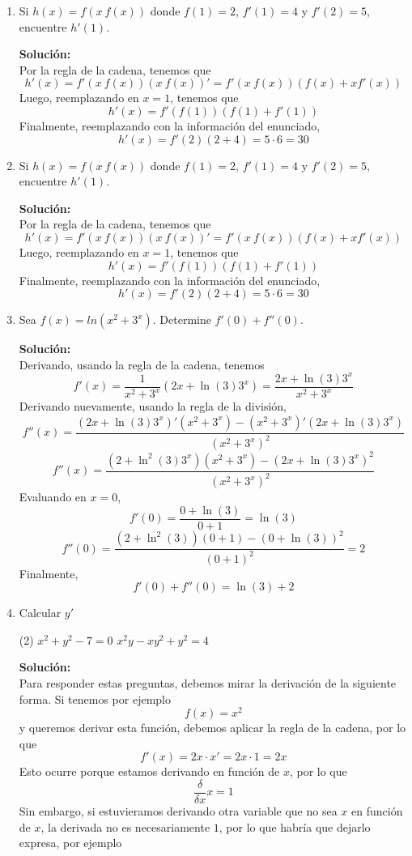 \documentclass[12pt]{article}
\newenvironment{solucion}
{\begin{mdframed}[backgroundcolor=black!10]
		{\bf Solución:}\\
	}
	{
	\end{mdframed}
}
\newenvironment{preguntas}
{\begin{enumerate}\itemsep12pt
	}
	{
	\end{enumerate}
}
\begin{document}
\begin{preguntas}
\begin{solucion}
$$g'(1) =\dfrac{-2(f(1))^5 - 5(f(1))^4f'(1)}{(f(1))^{10}} = -2-5\cdot (-2) = 8$$
\end{solucion}
\item Si $h(x) = f(x\ f(x))$ donde $f(1)=2$, $f'(1)=4$ y $f'(2) = 5$, encuentre $h'(1)$.
\begin{solucion}
Por la regla de la cadena, tenemos que
$$h'(x) = f'(x\ f(x)) (x\ f(x))' = f'(x\ f(x))(f(x) + xf'(x))$$
Luego, reemplazando en $x=1$, tenemos que
$$h'(x) = f'(f(1))(f(1) + f'(1))$$
Finalmente, reemplazando con la información del enunciado,
$$h'(x) = f'(2)(2+4) = 5\cdot 6 = 30$$
\end{solucion}
\item Si $h(x) = f(x\ f(x))$ donde $f(1)=2$, $f'(1)=4$ y $f'(2) = 5$, encuentre $h'(1)$.
\begin{solucion}
Por la regla de la cadena, tenemos que
$$h'(x) = f'(x\ f(x)) (x\ f(x))' = f'(x\ f(x))(f(x) + xf'(x))$$
Luego, reemplazando en $x=1$, tenemos que
$$h'(x) = f'(f(1))(f(1) + f'(1))$$
Finalmente, reemplazando con la información del enunciado,
$$h'(x) = f'(2)(2+4) = 5\cdot 6 = 30$$
\end{solucion}
\item Sea $f(x) = ln(x^2+3^x)$. Determine $f'(0) + f''(0)$.
\begin{solucion}
Derivando, usando la regla de la cadena, tenemos
$$f'(x) = \dfrac{1}{x^2+3^x}(2x + \ln(3)3^x) = \dfrac{2x + \ln(3)3^x}{x^2+3^x}$$
Derivando nuevamente, usando la regla de la división,
$$f''(x) = \dfrac{(2x + \ln(3)3^x)'(x^2+3^x) - (x^2+3^x)'(2x + \ln(3)3^x)}{(x^2+3^x)^2}$$
$$f''(x) = \dfrac{(2 + \ln^2(3)3^x)(x^2+3^x) - (2x + \ln(3)3^x)^2}{(x^2+3^x)^2}$$
Evaluando en $x=0$,
$$f'(0) = \dfrac{0 + \ln(3)}{0+1} = \ln(3)$$
$$f''(0) = \dfrac{(2+\ln^2(3))(0+1) - (0+\ln(3))^2}{(0+1)^2} = 2$$
Finalmente,
$$f'(0) + f''(0) = \ln(3) + 2$$
\end{solucion}
\item Calcular $y'$
\begin{tasks}(2)
\task $x^2+y^2-7=0$
\task $x^2y-xy^2+y^2=4$
\end{tasks}
\begin{solucion}
Para responder estas preguntas, debemos mirar la derivación de la siguiente forma. Si tenemos por ejemplo 
$$f(x) = x^2$$
y queremos derivar esta función, debemos aplicar la regla de la cadena, por lo que
$$f'(x) = 2x \cdot x' = 2x \cdot 1 = 2x$$
Esto ocurre porque estamos derivando en función de $x$, por lo que $$\dfrac{\delta}{\delta x} x = 1$$
Sin embargo, si estuvieramos derivando otra variable que no sea $x$ en función de $x$, la derivada no es necesariamente $1$, por lo que habría que dejarlo expresa, por ejemplo

\end{solucion}
\end{preguntas}
\end{document}
